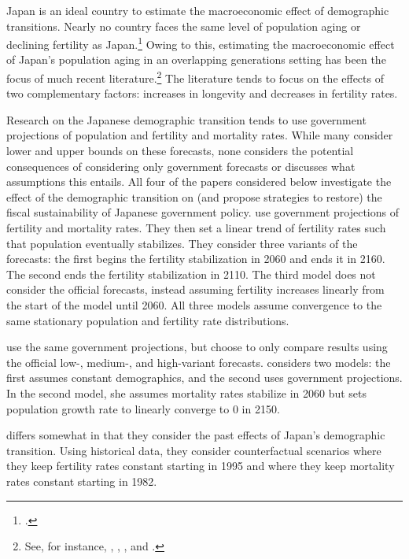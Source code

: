 \documentclass[10pt]{article}
\numberwithin{equation}{subsection}
\begin{document}
\par Japan is an ideal country to estimate the macroeconomic effect of demographic transitions. Nearly no country faces the same level of population aging or declining fertility as Japan.\footnote{\cite{MOS2016}.} Owing to this, estimating the macroeconomic effect of Japan's population aging in an overlapping generations setting has been the focus of much recent literature.\footnote{See, for instance, \cite{BJ2015}, \cite{IKY2016}, \cite{K2015}, and \cite{MOS2016}.} The literature tends to focus on the effects of two complementary factors: increases in longevity and decreases in fertility rates.

\par Research on the Japanese demographic transition tends to use government projections of population and fertility and mortality rates. While many consider lower and upper bounds on these forecasts, none considers the potential consequences of considering only government forecasts or discusses what assumptions this entails. All four of the papers considered below investigate the effect of the demographic transition on (and propose strategies to restore) the fiscal sustainability of Japanese government policy. \cite{BJ2015} use government projections of fertility and mortality rates. They then set a linear trend of fertility rates such that population eventually stabilizes. They consider three variants of the forecasts: the first begins the fertility stabilization in 2060 and ends it in 2160. The second ends the fertility stabilization in 2110. The third model does not consider the official forecasts, instead assuming fertility increases linearly from the start of the model until 2060. All three models assume convergence to the same stationary population and fertility rate distributions.

\par \cite{IKY2016} use the same government projections, but choose to only compare results using the official \mbox{low-,} \mbox{medium-,} and high-variant forecasts. \cite{K2015} considers two models: the first assumes constant demographics, and the second uses government projections. In the second model, she assumes mortality rates stabilize in 2060 but sets population growth rate to linearly converge to 0 in 2150.

\par \cite{MOS2016} differs somewhat in that they consider the past effects of Japan's demographic transition. Using historical data, they consider counterfactual scenarios where they keep fertility rates constant starting in 1995 and where they keep mortality rates constant starting in 1982.
\end{document}
